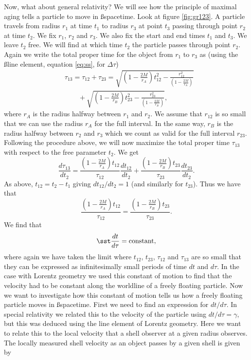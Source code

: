 {\begin{multicols}{2}
Now, what about general relativity? We will see how the principle of maximal aging tells a particle to move in \ss spacetime. Look at figure \ref{fig:gr123}. A particle travels from radius $r_1$ at time $t_1$ to radius $r_3$ at point $t_3$ passing through point $r_2$ at time $t_2$. We fix $r_1$, $r_2$ and $r_3$. We also fix the start and end times $t_1$ and $t_3$. We leave $t_2$ free. We will find at which time $t_2$ the particle passes through point $r_2$. Again we write the total proper time for the object from $r_1$ to $r_3$ as (using the \ss line element, equation \ref{eq:ss}, for $\Delta\tau$)
\begin{align*}
&\tau_{13}=\tau_{12}+\tau_{23}=\sqrt{\left(1-\frac{2M}{r_A}\right)t_{12}^2-\frac{r_{12}^2}{\left(1-\frac{2M}{r_A}\right)}} \\
& \qquad +\sqrt{\left(1-\frac{2M}{r_B}\right)t_{23}^2-\frac{r_{23}^2}{\left(1-\frac{2M}{r_B}\right)}},
\end{align*}
where $r_A$ is the radius halfway between $r_1$ and $r_2$. We assume that $r_{12}$ is so small that we can use the radius $r_A$ for the full interval. In the same way, $r_B$ is the radius halfway between $r_2$ and $r_3$ which we count as valid for the full interval $r_{23}$. Following the procedure above, we will now maximize the total proper time $\tau_{13}$ with respect to the free parameter $t_{2}$. We get
\[
\frac{d\tau_{13}}{dt_{2}}=\frac{\left(1-\frac{2M}{r_A}\right)t_{12}}{\tau_{12}}\frac{dt_{12}}{dt_{2}}+\frac{\left(1-\frac{2M}{r_B}\right)t_{23}}{\tau_{23}}\frac{dt_{23}}{dt_{2}}.
\]
As above, $t_{12}=t_{2}-t_{1}$ giving $dt_{12}/dt_{2}=1$ (and similarly for $t_{23}$). Thus we have that
\[
\frac{\left(1-\frac{2M}{r_A}\right)t_{12}}{\tau_{12}}=\frac{\left(1-\frac{2M}{r_B}\right)t_{23}}{\tau_{23}}.
\]
We find that
\begin{equation}
\label{eq:gene}
\sst\frac{dt}{d\tau}=\mathrm{constant},
\end{equation}
where again we have taken the limit where $t_{12}$, $t_{23}$, $\tau_{12}$ and $\tau_{13}$ are so small that they can be expressed as infinitesimally small periods of time $dt$ and $d\tau$. In the case with Lorentz geometry we used this constant of motion to find that the velocity had to be constant along the worldline of a freely floating particle. Now we want to investigate how this constant of motion tells us how a freely floating particle moves in \ss spacetime. First we need to find an expression for $dt/d\tau$. In special relativity we related this to the velocity of the particle using $dt/d\tau=\gamma$, but this was deduced using the line element of Lorentz geometry. Here we want to relate this to the local velocity that a shell observer at a given radius observes. The locally measured shell velocity as an object passes by a given shell is given by

\end{multicols}}
